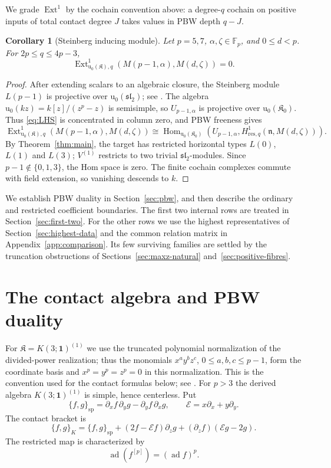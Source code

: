 \documentclass[11pt]{article}
\theoremstyle{plain}
\newtheorem{corollary}[corollary]{Corollary}
\theoremstyle{definition}
\theoremstyle{remark}
\numberwithin{equation}{section}
\newcommand{\kk}{k}
\newcommand{\Kalg}{\mathfrak K}
\newcommand{\slie}{\mathfrak{sl}_2}
\newcommand{\Ext}{\operatorname{Ext}}
\newcommand{\Hom}{\operatorname{Hom}}
\newcommand{\uenv}{\mathrm u}
\newcommand{\spb}{\mathrm{sp}}
\begin{document}
We grade $\Ext^1$ by the cochain convention above: a degree-$q$ cochain
on positive inputs of total contact degree $J$ takes values in PBW depth $q-J$.

\begin{corollary}[Steinberg inducing module]\label{cor:steinberg-source}
Let $p=5,7$, $\alpha,\zeta\in\mathbb F_p$, and $0\le d<p$.
For $2p\le q\le4p-3$,
\[
 \Ext^1_{\uenv_0(\Kalg),q}
       (M(p-1,\alpha),M(d,\zeta))=0.
\]
\end{corollary}
\begin{proof}
After extending scalars to an algebraic closure, the Steinberg module
$L(p-1)$ is projective over
$\uenv_0(\slie)$; see \cite[proof of Proposition~5, p.~3]{McNinchJordan}.
The algebra $\uenv_0(\kk z)=\kk[z]/(z^p-z)$ is semisimple, so
$U_{p-1,\alpha}$ is projective over $\uenv_0(\Kalg_0)$.
Thus \eqref{eq:LHS} is concentrated in column zero, and PBW freeness gives
\[
 \Ext^1_{\uenv_0(\Kalg),q}(M(p-1,\alpha),M(d,\zeta))
 \cong\Hom_{\uenv_0(\Kalg_0)}
       (U_{p-1,\alpha},H^1_{\mathrm{res},q}(\mathfrak n,M(d,\zeta))).
\]
By Theorem~\ref{thm:main}, the target has restricted horizontal types
$L(0)$, $L(1)$ and $L(3)$; $V^{(1)}$ restricts
to two trivial $\slie$-modules. Since $p-1\notin\{0,1,3\}$,
the Hom space is zero. The finite cochain complexes commute with
field extension, so vanishing descends to $\kk$.
\end{proof}


We establish PBW duality in Section~\ref{sec:pbw}, and then
describe the ordinary and restricted coefficient boundaries.
The first two internal rows are treated in Section~\ref{sec:first-two}.
For the other rows we use the highest representatives of
Section~\ref{sec:highest-data} and the common relation matrix in
Appendix~\ref{app:comparison}. Its few surviving families are
settled by the truncation obstructions of
Sections~\ref{sec:maxz-natural} and~\ref{sec:positive-fibres}.

\section{The contact algebra and PBW duality}\label{sec:contact}

For $\Kalg=K(3;\mathbf1)^{(1)}$ we use the truncated polynomial normalization of the divided-power realization; thus the monomials $x^ay^bz^c$, $0\le a,b,c\le p-1$, form the
coordinate basis and $x^p=y^p=z^p=0$ in this normalization.  This is the convention used
for the contact formulas below; see \cite{HolmesContact,ZhangCartan}.  For $p>3$ the
derived algebra $K(3;\mathbf1)^{(1)}$ is simple, hence centerless.  Put
\[
 \{f,g\}_{\spb}=\partial_xf\,\partial_yg-\partial_yf\,\partial_xg,
 \qquad
 \mathcal E=x\partial_x+y\partial_y.
\]
The contact bracket is
\begin{equation}\label{eq:contact-bracket}
 \{f,g\}_K
 =\{f,g\}_{\spb}
 +(2f-\mathcal Ef)\partial_zg
 +(\partial_zf)(\mathcal Eg-2g).
\end{equation}
The restricted map is characterized by
\[
 \operatorname{ad}(f^{[p]})=(\operatorname{ad}f)^p.
\]
\end{document}
